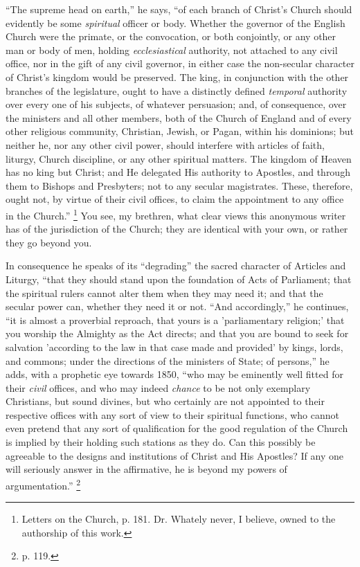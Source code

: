 ``The supreme head on earth,'' he says, ``of each
branch of Christ's Church should evidently be some \emph{spiritual}
officer or body. Whether the governor of the English Church were the
primate, or the convocation, or both conjointly, or any other man or
body of men, holding \emph{ecclesiastical} authority, not attached to
any civil office, nor in the gift of any civil governor, in either
case the non-secular character of Christ's kingdom would be preserved.
The king, in conjunction with the other branches of the legislature,
ought to have a distinctly defined \emph{temporal} authority over
every one of his subjects, of whatever persuasion; and, of consequence, over the ministers and all other members, both of the
Church of England and of every other religious community, Christian,
Jewish, or Pagan, within his dominions; but neither he, nor any other
civil power, should interfere with articles of faith, liturgy, Church
discipline, or any other spiritual matters. The kingdom of Heaven has
no king but Christ; and He delegated His authority to Apostles, and
through them to Bishops and Presbyters; not to any secular
magistrates. These, therefore, ought not, by virtue of their civil
offices, to claim the appointment to any office in the Church.'' \footnote{Letters on the Church, p. 181. Dr. Whately
never, I believe, owned to the authorship of this work.} You see, my brethren, what clear views this anonymous writer
has of the jurisdiction of the Church; they are identical with your
own, or rather they go beyond you.

In consequence he speaks of its ``degrading'' the sacred
character of Articles and Liturgy, ``that they should stand upon
the foundation of Acts of Parliament; that the spiritual rulers cannot
alter them when they may need it; and that the secular power can,
whether they need it or not. ``And accordingly,'' he continues,
``it is almost a proverbial reproach, that yours is a
'parliamentary religion;' that you worship the Almighty as the Act
directs; and that you are bound to seek for salvation 'according to
the law in that case made and provided' by kings, lords, and commons;
under the directions of the ministers of State; of persons,'' he
adds, with a prophetic eye towards 1850, ``who may be eminently
well fitted for their \emph{civil} offices, and who may indeed \emph{chance}
to be not only exemplary Christians, but sound divines, but who
certainly are not appointed to their respective offices with any sort
of view to their spiritual functions, who cannot even pretend that any
sort of qualification for the good regulation of the Church is implied
by their holding such stations as they do. Can this possibly be
agreeable to the designs and institutions of Christ and His Apostles?
If any one will seriously answer in the affirmative, he is beyond my
powers of argumentation.'' \footnote{p. 119.}

